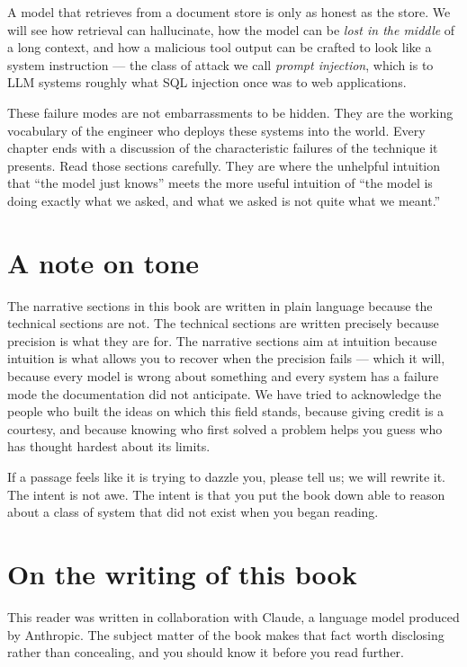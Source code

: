 \documentclass[11pt,a4paper,openany]{book}
\begin{document}
A model that retrieves from a document store is only as honest as
the store. We will see how retrieval can hallucinate, how the
model can be \emph{lost in the middle} of a long context, and how
a malicious tool output can be crafted to look like a system
instruction --- the class of attack we call \emph{prompt
injection}, which is to LLM systems roughly what SQL injection
once was to web applications.

These failure modes are not embarrassments to be hidden. They are
the working vocabulary of the engineer who deploys these systems
into the world. Every chapter ends with a discussion of the
characteristic failures of the technique it presents. Read those
sections carefully. They are where the unhelpful intuition that
``the model just knows'' meets the more useful intuition of
``the model is doing exactly what we asked, and what we asked is
not quite what we meant.''

\section*{A note on tone}

The narrative sections in this book are written in plain language
because the technical sections are not. The technical sections are
written precisely because precision is what they are for. The
narrative sections aim at intuition because intuition is what
allows you to recover when the precision fails --- which it will,
because every model is wrong about something and every system has
a failure mode the documentation did not anticipate. We have tried
to acknowledge the people who built the ideas on which this field
stands, because giving credit is a courtesy, and because knowing
who first solved a problem helps you guess who has thought hardest
about its limits.

If a passage feels like it is trying to dazzle you, please tell us;
we will rewrite it. The intent is not awe. The intent is that you
put the book down able to reason about a class of system that did
not exist when you began reading.

\section*{On the writing of this book}

This reader was written in collaboration with Claude, a language
model produced by Anthropic. The subject matter of the book makes
that fact worth disclosing rather than concealing, and you should
know it before you read further.
\end{document}
